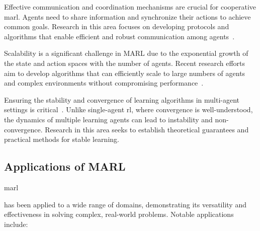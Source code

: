 Effective communication and coordination mechanisms are crucial for cooperative \gls{marl}. 
Agents need to share information and synchronize their actions to achieve common goals. 
Research in this area focuses on developing protocols and algorithms that enable efficient and 
robust communication among agents~\cite{sukhbaatar2016,fotouhi2019,hoang2023}.

Scalability is a significant challenge in MARL due to the exponential growth of the state and 
action spaces with the number of agents\cite{cao2012,busoniu2008}. 
Recent research efforts aim to develop algorithms that can efficiently scale to large numbers 
of agents and complex environments without compromising performance~\cite{smit2023,sun2023}.

Ensuring the stability and convergence of learning algorithms in multi-agent settings is 
critical~\cite{papoudakis2021}. 
Unlike single-agent \gls{rl}, where convergence is well-understood, 
the dynamics of multiple learning agents can lead to instability and non-convergence.
Research in this area seeks to establish theoretical guarantees and practical methods 
for stable learning.

\subsection*{Applications of MARL}

\Gls{marl}

has been applied to a wide range of domains, demonstrating its versatility and effectiveness in solving complex, real-world problems. Notable applications include:


\begin{comment}
    3.3 Applications of MARL

	•	Autonomous Driving: Coordinated control of multiple autonomous vehicles to improve traffic flow and safety.
	•	Robotics: Multi-robot systems for tasks such as search and rescue, where robots must collaborate to achieve a common objective.
	•	Economics and Finance: Modeling and simulation of market dynamics involving multiple agents with competing interests.
	•	Healthcare: Optimizing the allocation of resources and coordination of treatments across multiple healthcare providers.
	•	Key Paper: Yang, Y. et al. (2023). Efficient policy learning in large-scale heterogeneous-agent environments.


\end{comment}
